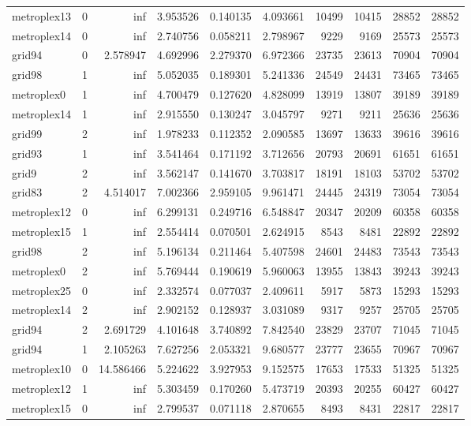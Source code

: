 \begin{longtable}{|l|r|r|r|r|r|r|r|r|r|}
metroplex13 & 0 & inf & 3.953526 & 0.140135 & 4.093661 & 10499 & 10415 & 28852 & 28852 \\
metroplex14 & 0 & inf & 2.740756 & 0.058211 & 2.798967 & 9229 & 9169 & 25573 & 25573 \\
grid94 & 0 & 2.578947 & 4.692996 & 2.279370 & 6.972366 & 23735 & 23613 & 70904 & 70904 \\
grid98 & 1 & inf & 5.052035 & 0.189301 & 5.241336 & 24549 & 24431 & 73465 & 73465 \\
metroplex0 & 1 & inf & 4.700479 & 0.127620 & 4.828099 & 13919 & 13807 & 39189 & 39189 \\
metroplex14 & 1 & inf & 2.915550 & 0.130247 & 3.045797 & 9271 & 9211 & 25636 & 25636 \\
grid99 & 2 & inf & 1.978233 & 0.112352 & 2.090585 & 13697 & 13633 & 39616 & 39616 \\
grid93 & 1 & inf & 3.541464 & 0.171192 & 3.712656 & 20793 & 20691 & 61651 & 61651 \\
grid9 & 2 & inf & 3.562147 & 0.141670 & 3.703817 & 18191 & 18103 & 53702 & 53702 \\
grid83 & 2 & 4.514017 & 7.002366 & 2.959105 & 9.961471 & 24445 & 24319 & 73054 & 73054 \\
metroplex12 & 0 & inf & 6.299131 & 0.249716 & 6.548847 & 20347 & 20209 & 60358 & 60358 \\
metroplex15 & 1 & inf & 2.554414 & 0.070501 & 2.624915 & 8543 & 8481 & 22892 & 22892 \\
grid98 & 2 & inf & 5.196134 & 0.211464 & 5.407598 & 24601 & 24483 & 73543 & 73543 \\
metroplex0 & 2 & inf & 5.769444 & 0.190619 & 5.960063 & 13955 & 13843 & 39243 & 39243 \\
metroplex25 & 0 & inf & 2.332574 & 0.077037 & 2.409611 & 5917 & 5873 & 15293 & 15293 \\
metroplex14 & 2 & inf & 2.902152 & 0.128937 & 3.031089 & 9317 & 9257 & 25705 & 25705 \\
grid94 & 2 & 2.691729 & 4.101648 & 3.740892 & 7.842540 & 23829 & 23707 & 71045 & 71045 \\
grid94 & 1 & 2.105263 & 7.627256 & 2.053321 & 9.680577 & 23777 & 23655 & 70967 & 70967 \\
metroplex10 & 0 & 14.586466 & 5.224622 & 3.927953 & 9.152575 & 17653 & 17533 & 51325 & 51325 \\
metroplex12 & 1 & inf & 5.303459 & 0.170260 & 5.473719 & 20393 & 20255 & 60427 & 60427 \\
metroplex15 & 0 & inf & 2.799537 & 0.071118 & 2.870655 & 8493 & 8431 & 22817 & 22817 \\

\end{longtable}
